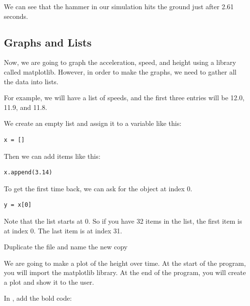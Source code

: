 We can see that the hammer in our simulation hits the ground just
after 2.61 seconds.

\subsection{Graphs and Lists}

Now, we are going to graph the acceleration, speed, and height using a
library called matplotlib. However, in order to make the graphs, we
need to gather all the data into lists.

For example, we will have a list of speeds, and the first three
entries will be 12.0, 11.9, and 11.8.

We create an empty list and assign it to a variable like this:
\begin{Verbatim}
x = []
\end{Verbatim}

Then we can add items like this:
\begin{Verbatim}
x.append(3.14)
\end{Verbatim}

To get the first time back, we can ask for the object at index 0.
\begin{Verbatim}
y = x[0]
\end{Verbatim}
Note that the list starts at 0.  So if you have 32 items in the list,
the first item is at index 0. The last item is at index 31.

Duplicate the file  and name the new copy 

We are going to make a plot of the height over time. At the start of the program, you will import the
matplotlib library.  At the end of the program, you will create a plot and show it to the user.

In , add the bold code:

